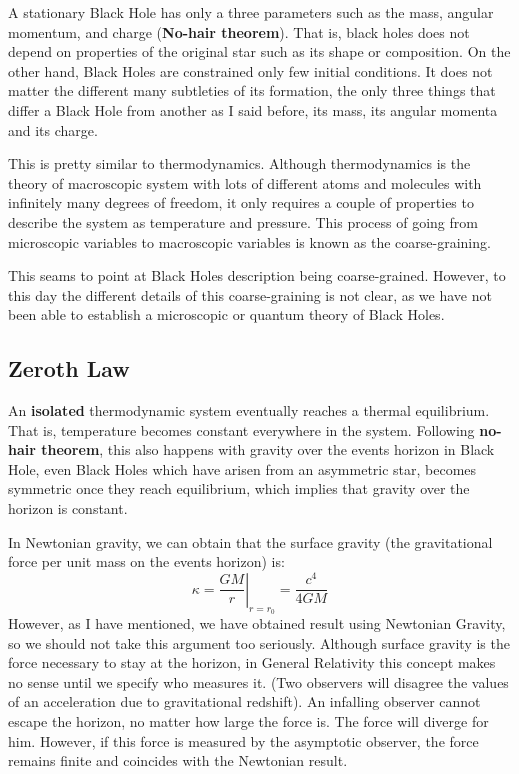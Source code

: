 \documentclass[12pt]{article}
\begin{document}
A stationary Black Hole has only a three parameters such as the mass, angular momentum, and charge (\textbf{No-hair theorem}). That is, black holes does not depend on properties of the original star such as its shape or composition. On the other hand, Black Holes are constrained only few initial conditions. It does not matter the different many subtleties of its formation, the only three things that differ a Black Hole from another as I said before, its mass, its angular momenta and its charge.

This is pretty similar to thermodynamics. Although thermodynamics is the theory of macroscopic system with lots of different atoms and molecules with infinitely many degrees of freedom, it only requires a couple of properties to describe the system as temperature and pressure. This process of going from microscopic variables to macroscopic variables is known as the coarse-graining.

This seams to point at Black Holes description being coarse-grained. However, to this day the different details of this coarse-graining is not clear, as we have not been able to establish a microscopic or quantum theory of Black Holes.

\subsection{Zeroth Law}

An \textbf{isolated} thermodynamic system eventually reaches a thermal equilibrium. That is, temperature becomes constant everywhere in the system. Following \textbf{no-hair theorem}, this also happens with gravity over the events horizon in Black Hole, even Black Holes which have arisen from an asymmetric star, becomes symmetric once they reach equilibrium, which implies that gravity over the horizon is constant.

\vspace{.25cm}

In Newtonian gravity, we can obtain that the surface gravity (the gravitational force per unit mass on the events horizon) is:
\[
    \kappa = \left.\frac{GM}{r}\right|_{r=r_0} = \frac{c^4}{4GM}
\]
However, as I have mentioned, we have obtained result using Newtonian Gravity, so we should not take this argument too seriously. Although surface gravity is the force necessary to stay at the horizon, in General Relativity this concept makes no sense until we specify who measures it. (Two observers will disagree the values of an acceleration due to gravitational redshift). An infalling observer cannot escape the horizon, no matter how large the force is. The force will diverge for him. However, if this force is measured by the asymptotic observer, the force remains finite and coincides with the Newtonian result.
\end{document}
